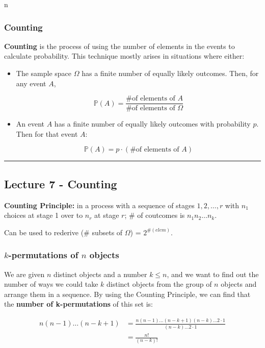 n\documentclass{article}
\begin{document}
\subsubsection{Counting}

\textbf{Counting} is the process of using the number of elements in
the events to calculate probability. This technique mostly arises in
situations where either:

\begin{itemize}
\item The sample space $\Omega$ has a finite number of equally likely
  outcomes. Then, for any event $A$,

  \[
    \mathbb{P}(A) = \frac{\text{\# of elements of } A}
    {\text{\# of elements of } \Omega}
  \]

\item An event $A$ has a finite number of equally likely outcomes with
  probability $p$. Then for that event $A$:

  \[
    \mathbb{P}(A) = p \cdot (\text{\# of elements of }A)
  \]
\end{itemize}


\medskip\hrule
\subsection{Lecture 7 - Counting}

\textbf{Counting Principle:} in a process with a sequence of stages
$1, 2, \dots, r$ with $n_1$ choices at stage 1 over to $n_r$ at stage
$r$; \# of coutcomes is $n_1 n_2 \dots n_k$.

Can be used to rederive (\# subsets of $\Omega$) = $2^{\#(elem)}$.

\bigskip
\subsubsection{$k$-permutations of $n$ objects}

We are given $n$ distinct objects and a number $k \leq n$, and we want
to find out the number of ways we could take $k$ distinct objects from
the group of $n$ objects and arrange them in a sequence. By using the
Counting Principle, we can find that the \textbf{number of
  k-permutations} of this set is:

\begin{equation}
  \tag{K-permutations}
  \boxed{
    \begin{aligned}
      n (n-1) \dots (n-k+1)
      &= \frac{n (n-1) \dots (n-k+1) (n-k) \dots 2 \cdot 1}{(n-k)
        \dots 2 \cdot 1} \\
      &= \frac{n!}{(n-k)!}
    \end{aligned}
  }
\end{equation}
\end{document}
